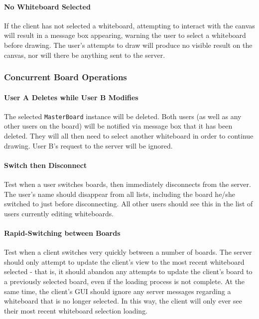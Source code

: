 \paragraph{No Whiteboard Selected}
If the client has not selected a whiteboard, attempting to interact with the canvas will result in a message box appearing, warning the user to select a whiteboard before drawing. The user's attempts to draw will produce no visible result on the canvas, nor will there be anything sent to the server.

\subsubsection{Concurrent Board Operations}

\paragraph{User A Deletes while User B Modifies}
The selected \texttt{MasterBoard} instance will be deleted. Both users (as well as any other users on the board) will be notified via message box that it has been deleted. They will all then need to select another whiteboard in order to continue drawing. User B's request to the server will be ignored.

\paragraph{Switch then Disconnect}
Test when a user switches boards, then immediately disconnects from the server. The user's name should disappear from all lists, including the board he/she switched to just before disconnecting. All other users should see this in the list of users currently editing whiteboards.

\paragraph{Rapid-Switching between Boards}
Test when a client switches very quickly between a number of boards.  The server should only attempt to update the client's view to the most recent whiteboard selected - that is, it should abandon any attempts to update the client's board to a previously selected board, even if the loading process is not complete. At the same time, the client's GUI should ignore any server messages regarding a whiteboard that is no longer selected. In this way, the client will only ever see their most recent whiteboard selection loading.

